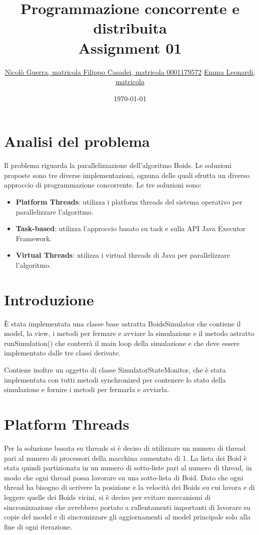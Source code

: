 \documentclass[11pt,notitlepage]{article}
\title{Programmazione concorrente e distribuita \\ Assignment 01}
\author{
    \href{mailto:nicolo.guerra@studio.unibo.it}{Nicolò Guerra, matricola }
    \href{mailto:filippo.casadei9@studio.unibo.it}{Filippo Casadei, matricola 0001179572}
    \href{mailto:emma.leonardi2@studio.unibo.it}{Emma Leonardi, matricola }
    }
\date{\today}
\begin{document}
\maketitle
\renewcommand{\thesection}{\arabic{section}}
\section{Analisi del problema}
Il problema riguarda la parallelizzazione dell'algoritmo Boids. Le soluzioni proposte sono tre diverse implementazioni, ognuna delle quali sfrutta un diverso approccio di 
programmazione concorrente. 
Le tre soluzioni sono: 
\begin{itemize}
    \item \textbf{Platform Threads}: utilizza i platform threads del sistema operativo per parallelizzare l'algoritmo.
    \item \textbf{Task-based}: utilizza l'approccio basato su task e sulla API Java Executor Framework.
    \item \textbf{Virtual Threads}: utilizza i virtual threads di Java per parallelizzare l'algoritmo.
\end{itemize}

\section{Introduzione}
È stata implementata una classe base astratta \textsf{BoidsSimulator} che contiene il model, la view, i metodi per fermare e avviare la simulazione e il metodo astratto 
\textsf{runSimulation()} che conterrà il main loop della simulazione e che deve essere implementato dalle tre classi derivate.

Contiene inoltre un oggetto di classe \textsf{SimulatorStateMonitor}, che è stata implementata con tutti metodi \textsf{synchronized} per contenere lo stato della simulazione
e fornire i metodi per fermarla e avviarla.

\section{Platform Threads}
Per la soluzione basata su threads si è deciso di utilizzare un numero di thread pari al numero di processori della macchina aumentato di 1. La lista dei Boid è stata
quindi partizionata in un numero di sotto-liste pari al numero di thread, in modo che ogni thread possa lavorare su una sotto-lista di Boid.
Dato che ogni thread ha bisogno di scrivere la posizione e la velocità dei Boids su cui lavora e di leggere quelle dei Boids vicini, si è deciso per evitare meccanismi di 
sincronizzazione che avrebbero portato a rallentamenti importanti di lavorare su copie del model e di sincronizzare gli aggiornamenti al model principale solo alla fine di ogni
iterazione.
\end{document}
